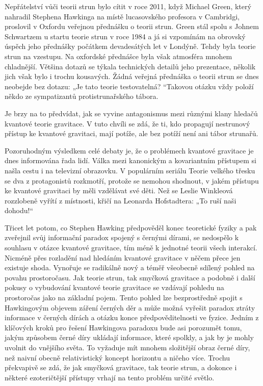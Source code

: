   Nepřátelství vůči teorii strun bylo cítit v roce 2011, když Michael Green, který nahradil Stephena
  Hawkinga na místě lucasovského profesora v Cambridgi, proslovil v Oxfordu veřejnou přednášku o
  teorii strun. Green stál spolu s Johnem Schwartzem u startu teorie strun v roce 1984 a já si
  vzpomínám na obrovský úspěch jeho přednášky počátkem devadesátých let v Londýně. Tehdy byla teorie
  strun na vzestupu. Na oxfordské přednášce byla však atmosféra mnohem chladnější. Většina dotazů se
  týkala technických detailů jeho prezentace, několik jich však bylo i trochu kousavých. Žádná
  veřejná přednáška o teorii strun se dnes neobejde bez dotazu: „Je tato teorie testovatelná?
  “Takovou otázku vždy položí někdo ze sympatizantů protistrunařského tábora. 
  
  Je brzy na to předvídat, jak se vyvine antagonismus mezi různými klany hledačů kvantové teorie
  gravitace. V tuto chvíli se zdá, že ti, kdo propagují nestrunový přístup ke kvantové gravitaci,
  mají potíže, ale bez potíží není ani tábor strunařů. 
  
  Pozoruhodným výsledkem celé debaty je, že o problémech kvantové gravitace je dnes informována řada
  lidí. Válka mezi kanonickým a kovariantním přístupem si našla cestu i na televizní obrazovku. V
  populárním seriálu Teorie velkého třesku se dva z protagonistů rozkmotří, protože se nemohou
  shodnout, v jakém přístupu ke kvantové gravitaci by měli vzdělávat své děti. Než se Leslie
  Winkleová rozzlobeně vyřítí z místnosti, křičí na Leonarda Hofstadtera: „To ruší naši dohodu!“
  
  Třicet let potom, co Stephen Hawking předpověděl konec teoretické fyziky a pak zveřejnil svůj
  informační paradox spojený s černými dírami, se nedospělo k souhlasu v otázce kvantové gravitace,
  tím méně k jednotné teorii všech interakcí. Nicméně přes rozladění nad hledáním kvantové gravitace
  v něčem přece jen existuje shoda. Vynořuje se radikálně nový a téměř všeobecně sdílený pohled na
  povahu prostoročasu. Jak teorie strun, tak smyčková gravitace a podobně i další pokusy o
  vybudování kvantové teorie gravitace se vzdávají pohledu na prostoročas jako na základní pojem.
  Tento pohled lze bezprostředně spojit s Hawkingovým objevem záření černých děr a může možná
  vyřešit paradox ztráty informace v černých dírách a otázku konce předpověditelnosti ve fyzice.
  Jedním z klíčových kroků pro řešení Hawkingova paradoxu bude asi porozumět tomu, jakým způsobem
  černé díry ukládají informace, které spolkly, a jak by je mohly uvolnit do vnějšího světa. To
  vyžaduje mít mnohem složitější obraz černé díry, než naivní obecně relativistický koncept
  horizontu a ničeho více. Trochu překvapivě se zdá, že jak smyčková gravitace, tak teorie strun, a
  dokonce i některé ezoteričtější přístupy vrhají na tento problém určité světlo. 
  
